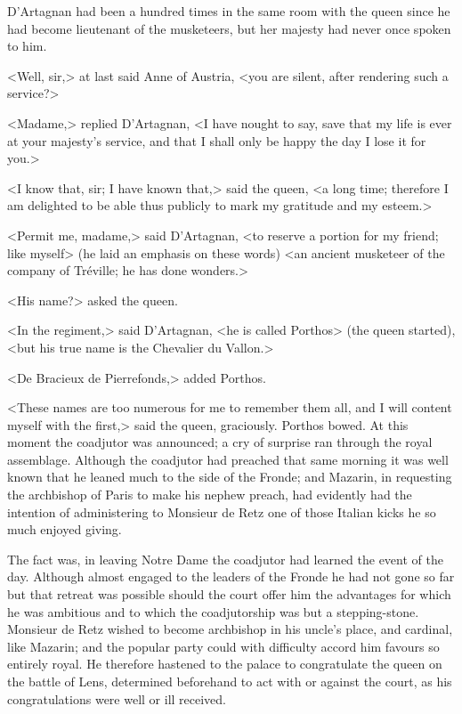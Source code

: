 D'Artagnan had been a hundred times in the same room with the queen since he had become lieutenant of the musketeers, but her majesty had never once spoken to him.

<Well, sir,> at last said Anne of Austria, <you are silent, after rendering such a service?>

<Madame,> replied D'Artagnan, <I have nought to say, save that my life is ever at your majesty's service, and that I shall only be happy the day I lose it for you.>

<I know that, sir; I have known that,> said the queen, <a long time; therefore I am delighted to be able thus publicly to mark my gratitude and my esteem.>

<Permit me, madame,> said D'Artagnan, <to reserve a portion for my friend; like myself> (he laid an emphasis on these words) <an ancient musketeer of the company of Tréville; he has done wonders.>

<His name?> asked the queen.

<In the regiment,> said D'Artagnan, <he is called Porthos> (the queen started), <but his true name is the Chevalier du Vallon.>

<De Bracieux de Pierrefonds,> added Porthos.

<These names are too numerous for me to remember them all, and I will content myself with the first,> said the queen, graciously. Porthos bowed. At this moment the coadjutor was announced; a cry of surprise ran through the royal assemblage. Although the coadjutor had preached that same morning it was well known that he leaned much to the side of the Fronde; and Mazarin, in requesting the archbishop of Paris to make his nephew preach, had evidently had the intention of administering to Monsieur de Retz one of those Italian kicks he so much enjoyed giving.

The fact was, in leaving Notre Dame the coadjutor had learned the event of the day. Although almost engaged to the leaders of the Fronde he had not gone so far but that retreat was possible should the court offer him the advantages for which he was ambitious and to which the coadjutorship was but a stepping-stone. Monsieur de Retz wished to become archbishop in his uncle's place, and cardinal, like Mazarin; and the popular party could with difficulty accord him favours so entirely royal. He therefore hastened to the palace to congratulate the queen on the battle of Lens, determined beforehand to act with or against the court, as his congratulations were well or ill received.

